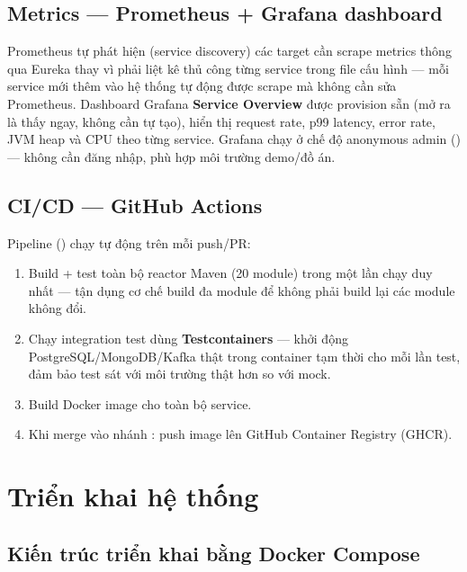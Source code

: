 \documentclass[12pt,a4paper]{report}
\begin{document}
\section{Metrics — Prometheus + Grafana dashboard}

Prometheus tự phát hiện (service discovery) các target cần scrape metrics
thông qua Eureka thay vì phải liệt kê thủ công từng service trong file cấu
hình — mỗi service mới thêm vào hệ thống tự động được scrape mà không cần sửa
Prometheus. Dashboard Grafana \textbf{Service Overview} được provision sẵn
(mở ra là thấy ngay, không cần tự tạo), hiển thị request rate, p99 latency,
error rate, JVM heap và CPU theo từng service. Grafana chạy ở chế độ anonymous
admin () — không cần đăng nhập, phù hợp
môi trường demo/đồ án.

\section{CI/CD — GitHub Actions}

Pipeline () chạy tự động trên mỗi push/PR:

\begin{enumerate}[nosep]
    \item Build + test toàn bộ reactor Maven (20 module) trong một lần chạy
    duy nhất — tận dụng cơ chế build đa module để không phải build lại các
    module không đổi.
    \item Chạy integration test dùng \textbf{Testcontainers} — khởi động
    PostgreSQL/MongoDB/Kafka thật trong container tạm thời cho mỗi lần test,
    đảm bảo test sát với môi trường thật hơn so với mock.
    \item Build Docker image cho toàn bộ service.
    \item Khi merge vào nhánh : push image lên GitHub Container
    Registry (GHCR).
\end{enumerate}

\chapter{Triển khai hệ thống}

\section{Kiến trúc triển khai bằng Docker Compose}
\end{document}
